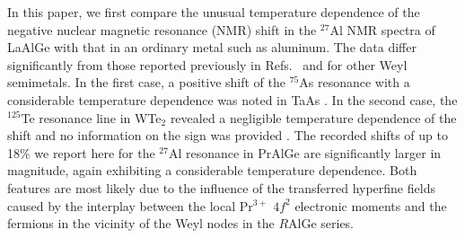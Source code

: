 \documentclass[aps,prb,a4paper,10pt,twocolumn,showpacs,floatfix,superscriptaddress,preprintnumbers,longbibliography]{revtex4-2}
\begin{document}
In this paper, we first compare the unusual temperature dependence
of the negative nuclear magnetic resonance (NMR) shift in the $^{27}$Al
NMR spectra of LaAlGe with that in an ordinary metal such as aluminum.
The data differ significantly from those reported previously in
Refs.~\cite{Wang2020landau} and \cite{antonenko2019nmr} for
other Weyl semimetals. In the first case, a positive shift of the
$^{75}$As resonance with a considerable temperature dependence was
noted in TaAs \cite{Wang2020landau}. In the second case, the $^{125}$Te
resonance line in WTe$_2$ revealed a negligible temperature dependence
of the shift and no information on the sign was provided %
\cite{antonenko2019nmr}.
The recorded shifts of up to 18\% we report here for the $^{27}$Al
resonance in PrAlGe are significantly larger in magnitude, again
exhibiting a considerable temperature dependence. Both features
are most likely due to the influence of the transferred hyperfine fields
caused by the interplay between the local Pr$^{3+}$ 
$4f^2$ electronic moments
and the fermions in the vicinity of the Weyl nodes in the $R$AlGe series.


%
\end{document}
